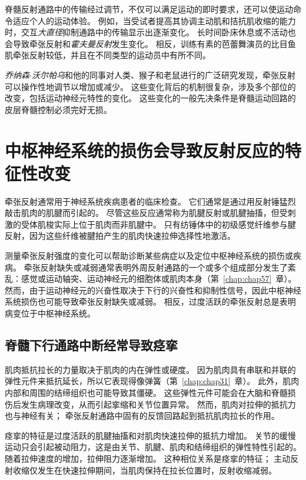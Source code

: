 脊髓反射通路中的传输经过调节，不仅可以满足运动的即时要求，还可以使运动命令适应个人的运动体验。
例如，当受试者提高其协调主动肌和拮抗肌收缩的能力时，交互\textit{大直径}抑制通路中的传输显示出逐渐变化。
长时间卧床休息或不活动也会导致牵张反射和\textit{霍夫曼反射}发生变化。
相反，训练有素的芭蕾舞演员的比目鱼肌牵张反射较低，并且在不同类型的运动员中有所不同。


\textit{乔纳森$\cdot$沃尔帕乌}和他的同事对人类、猴子和老鼠进行的广泛研究发现，牵张反射可以操作性地调节以增加或减少。
这些变化背后的机制很复杂，涉及多个部位的改变，包括运动神经元特性的变化。
这些变化的一般先决条件是脊髓运动回路的皮层脊髓控制必须完好无损。



\section{中枢神经系统的损伤会导致反射反应的特征性改变}

牵张反射通常用于神经系统疾病患者的临床检查。
它们通常是通过用反射锤猛烈敲击肌肉的肌腱而引起的。
尽管这些反应通常称为肌腱反射或肌腱抽搐，但受刺激的受体肌梭实际上位于肌肉而非肌腱中。
只有纺锤体中的初级感觉纤维参与腱反射，因为这些纤维被腱拍产生的肌肉快速拉伸选择性地激活。


测量牵张反射强度的变化可以帮助诊断某些病症以及定位中枢神经系统的损伤或疾病。
牵张反射缺失或减弱通常表明外周反射通路的一个或多个组成部分发生了紊乱：感觉或运动轴突、运动神经元的细胞体或肌肉本身（第~\ref{chap:chap57}~章）。
然而，由于运动神经元的兴奋性取决于下行的兴奋性和抑制性信号，因此中枢神经系统损伤也可能导致牵张反射缺失或减弱。
相反，过度活跃的牵张反射总是表明病变位于中枢神经系统。



\subsection{脊髓下行通路中断经常导致痉挛}

肌肉抵抗拉长的力量取决于肌肉的内在弹性或硬度。
因为肌肉具有串联和并联的弹性元件来抵抗延长，所以它表现得像弹簧（第~\ref{chap:chap31}~章）。
此外，肌肉内部和周围的结缔组织也可能导致其僵硬。
这些弹性元件可能会在大脑和脊髓损伤后发生病理改变，从而引起挛缩和关节位置异常。
然而，肌肉对拉伸的抵抗力也与神经有关；
牵张反射通路中固有的反馈回路起到抵抗肌肉拉长的作用。


痉挛的特征是过度活跃的肌腱抽搐和对肌肉快速拉伸的抵抗力增加。
关节的缓慢运动只会引起被动阻力，这是由关节、肌腱、肌肉和结缔组织的弹性特性引起的。
随着拉伸速度的增加，拉伸阻力逐渐增加。
这种相位关系是痉挛的特征；
主动反射收缩仅发生在快速拉伸期间，当肌肉保持在拉长位置时，反射收缩减弱。


